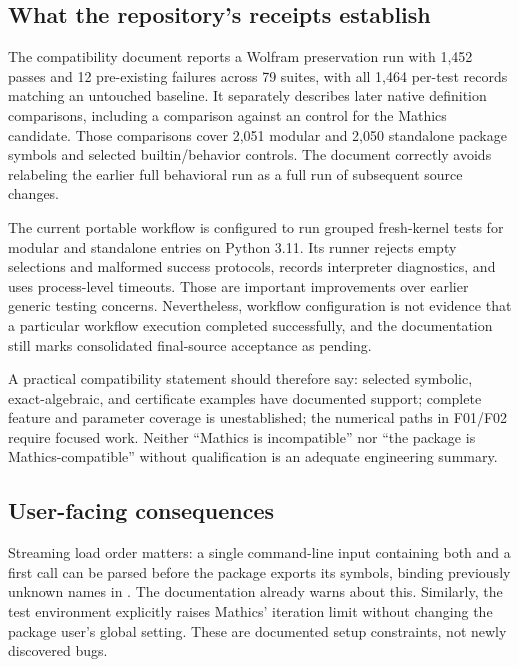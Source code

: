 \documentclass[11pt,letterpaper]{article}
\newcommand{\code}[1]{\texttt{\detokenize{#1}}}
\begin{document}
\subsection{What the repository's receipts establish}

The compatibility document reports a Wolfram preservation run with 1,452 passes and 12 pre-existing failures across 79 suites, with all 1,464 per-test records matching an untouched \code{6687962} baseline. It separately describes later native definition comparisons, including a comparison against an \code{a55df16} control for the Mathics candidate. Those comparisons cover 2,051 modular and 2,050 standalone package symbols and selected builtin/behavior controls. The document correctly avoids relabeling the earlier full behavioral run as a full run of subsequent source changes.\cite{mathics-doc}

The current portable workflow is configured to run grouped fresh-kernel tests for modular and standalone entries on Python 3.11. Its runner rejects empty selections and malformed success protocols, records interpreter diagnostics, and uses process-level timeouts. Those are important improvements over earlier generic testing concerns. Nevertheless, workflow configuration is not evidence that a particular workflow execution completed successfully, and the documentation still marks consolidated final-source acceptance as pending.\cite{mathics-ci,portable-runner,portable-tests,mathics-doc}

A practical compatibility statement should therefore say: selected symbolic, exact-algebraic, and certificate examples have documented support; complete feature and parameter coverage is unestablished; the numerical paths in F01/F02 require focused work. Neither ``Mathics is incompatible'' nor ``the package is Mathics-compatible'' without qualification is an adequate engineering summary.

\subsection{User-facing consequences}

Streaming load order matters: a single command-line input containing both \code{Get} and a first call can be parsed before the package exports its symbols, binding previously unknown names in \code{Global}. The documentation already warns about this. Similarly, the test environment explicitly raises Mathics' iteration limit without changing the package user's global setting. These are documented setup constraints, not newly discovered bugs.\cite{mathics-doc,portable-tests}
\end{document}
